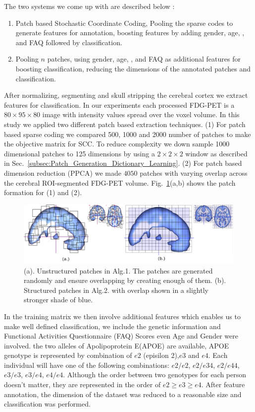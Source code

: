 The two systems we come up with are described below : 
\begin{enumerate}
	\item  Patch based Stochastic Coordinate Coding, Pooling the sparse codes to generate features for annotation, boosting features by adding gender, age, ,  and FAQ followed by classification. 
	\item Pooling $ n $ patches, using gender, age, ,  and FAQ as additional features for boosting classification, reducing the dimensions of the annotated patches and classification. 
\end{enumerate}

After normalizing, segmenting and skull stripping the cerebral cortex we extract features for classification.  In our experiments each processed FDG-PET is a $ 80 \times 95 \times 80 $ image with intensity values spread over the voxel volume. In this study we applied two different patch based extraction techniques. (1) For patch based sparse coding we compared 500, 1000 and 2000 number of patches to make the objective matrix for SCC. To reduce complexity we down sample 1000 dimensional patches to 125 dimensions by using a $ 2 \times 2 \times 2 $ window as described in Sec.~\ref{subsec:Patch_Generation_Dictionary_Learning}. (2) For patch based dimension reduction (PPCA) we made $ 4050 $ patches with varying overlap across the cerebral ROI-segmented FDG-PET volume. Fig.~\ref{fig:patches}(a,b) shows the patch formation for (1) and (2).

\begin{figure}
	\centering
	\includegraphics[width=\linewidth]{figures/patches}
	\caption[Unstructured and Structured patches in Axial, Sagittal and Coronal view of the brain.]{(a). Unstructured patches in Alg.1. The patches are generated randomly and ensure overlapping by creating enough of them. (b). Structured patches in Alg.2. with overlap shown in a slightly stronger shade of blue.}
	\label{fig:patches}
\end{figure}

In the training matrix we then involve additional features which enables us to make well defined classification, we include the genetic information and Functional Activities Questionnaire (FAQ) Scores even Age and Gender were involved. the two alleles of Apolipoprotein E(APOE) are available, APOE genotype is represented by combination of $e2$ (episilon 2),$e3$ and $e4$. Each individual will have one of the following combinations: $e2/e2$, $e2/e34$, $e2/e44$, $e3/e3$, $e3/e4$, $e4/e4$. Although the order between two genotypes for each person doesn't matter, they are represented in the order of $e2 \ge e3 \ge e4$. After feature annotation, the dimension of the dataset was reduced to a reasonable size and classification was performed.

